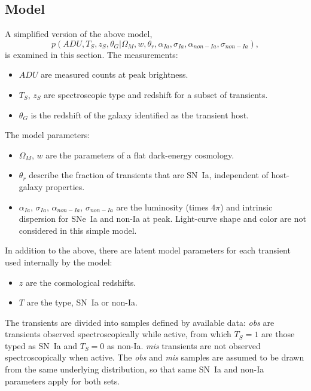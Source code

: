 \documentclass[preprint]{aastex}
\begin{document}
\subsection{Model}
\label{example:sec}
A simplified version of the above model,
\begin{equation}
p(\mathit{ADU}, {{T}}_S,{{z}}_S, \theta_G|  \Omega_M, w, \theta_r,\alpha_{Ia},\sigma_{Ia}, \alpha_{\mathit{non-Ia}},\sigma_{\mathit{non-Ia}}),
\end{equation}
is examined in this section.
The measurements: 
\begin{itemize}
\item $\mathit{ADU}$ are measured counts at peak brightness.
\item ${{T}}_S$, ${{z}}_S$ are spectroscopic type and redshift for a subset of transients.
\item $\theta_G$ is the redshift of the galaxy identified as the transient host.
\end{itemize}
The model parameters:
\begin{itemize}
\item $\Omega_M$, $w$ are the parameters of a flat dark-energy cosmology.
\item $\theta_r$ describe the fraction of transients that are SN~Ia, independent
of host-galaxy properties.
\item $\alpha_{Ia}$, $\sigma_{Ia}$, $\alpha_{\mathit{non-Ia}}$, $\sigma_{\mathit{non-Ia}}$ are
the luminosity (times $4\pi$) and intrinsic dispersion for SNe~Ia and non-Ia at peak.
Light-curve shape and color are not considered in this simple model.
\end{itemize}

In addition to the above, there are latent model parameters for each transient used internally
by the model:
\begin{itemize}
\item $z$ are the cosmological redshifts.
\item $T$ are the type, SN~Ia or non-Ia.
\end{itemize}

The transients are divided into samples defined by available data: {\it obs} are transients observed spectroscopically while active, from which $T_S=1$ are those typed
as SN~Ia and $T_S=0$ as non-Ia.  {\it mis} transients are not observed
spectroscopically when active.  The  {\it obs} and {\it mis} samples
are assumed to be drawn from the same underlying distribution, so that 
same SN~Ia and non-Ia parameters apply for both sets.
\end{document}
